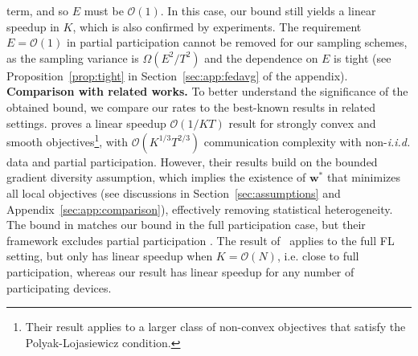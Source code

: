 term, and so $E$ must be $\mathcal{O}(1)$. In this case, our bound
still yields a linear speedup in $K$, which is also confirmed by
experiments. The requirement $E=\mathcal{O}(1)$ in partial participation cannot be removed for our sampling schemes, as the sampling
variance is $\Omega(E^{2}/T^{2})$ and the dependence on $E$ is tight (see Proposition~\ref{prop:tight} in Section~\ref{sec:app:fedavg} of the appendix).  \\
\textbf{Comparison with related works.} To better understand the significance of the obtained bound, we compare our rates to the best-known results in related settings. \cite{haddadpour2019convergence} proves a linear speedup $\mathcal{O}(1/KT)$ result for strongly convex and smooth objectives\footnote{Their result applies to a larger class of non-convex objectives that satisfy the Polyak-Lojasiewicz condition.}, with $\mathcal{O}(K^{1/3}T^{2/3})$ communication complexity with non-\emph{i.i.d.} data and partial participation. However, their results build on the bounded gradient diversity assumption, which implies the existence of $\mathbf{w}^*$ that minimizes all local objectives (see discussions in Section~\ref{sec:assumptions} and Appendix~\ref{sec:app:comparison}), effectively removing statistical heterogeneity. The bound in \cite{koloskova2020unified} matches our bound in the full participation case, but their framework excludes partial participation \cite[Proposition 1]{koloskova2020unified}. The result of~\cite{karimireddy2019scaffold} applies to the full FL setting, but only has linear speedup when $K=\mathcal{O}(N)$, i.e. close to full participation, whereas our result has linear speedup for any number of participating devices.

\begin{comment}
	In this overparameterized setting, we prove a geometric convergence rate (see Section~\ref{sec:overparameterized}), 
	thus improving on the rate in \cite{haddadpour2019convergence} with
	better communication complexity. 
\end{comment}

